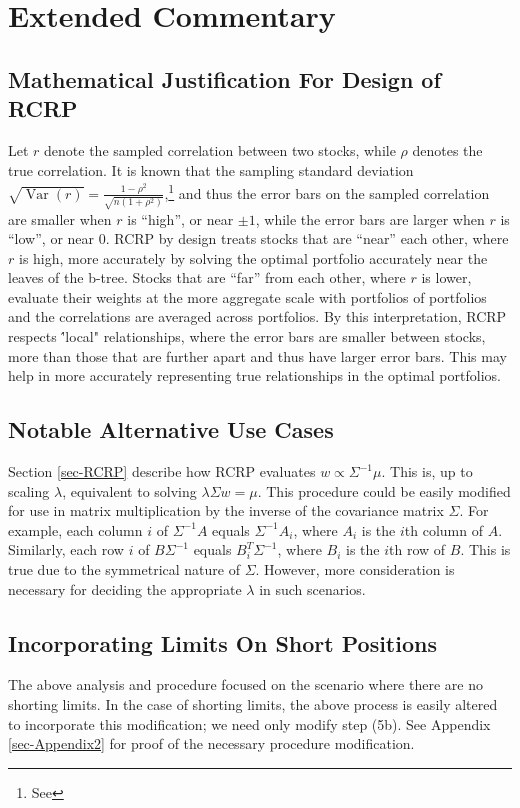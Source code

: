 \documentclass[10pt,twoside,titlepage]{article}   %
\begin{document}
\section{Extended Commentary}\label{sec-Commentary}
\subsection{Mathematical Justification For Design of RCRP}\label{sec-MatheComment}
Let $r$ denote the sampled correlation between two stocks, while $\rho$ denotes the true correlation.
It is known that the sampling standard deviation $\sqrt{\operatorname{Var}(r)}= \frac{ 1 - \rho^2}{\sqrt{n (1+\rho^2) }}$,\footnote{See \CORRURL}
and thus the error bars on the sampled correlation are smaller when $r$ is “high”, or near $\pm 1$,
while the error bars are larger when $r$ is “low”, or near 0.
RCRP by design treats stocks that are “near” each other, where $r$ is high,
more accurately by solving the optimal portfolio accurately near the leaves of the b-tree.
Stocks that are “far” from each other, where $r$ is lower,
evaluate their weights at the more aggregate scale with portfolios of portfolios and the correlations are averaged across portfolios.
By this interpretation, RCRP respects \''local" relationships, where the error bars are smaller between stocks, more than those that are further apart and thus have larger error bars.
This may help in more accurately representing true relationships in the optimal portfolios.

\subsection{Notable Alternative Use Cases}\label{sec-AltUseCase}
Section \ref{sec-RCRP} describe how RCRP evaluates $w \propto \Sigma^{-1}\mu$. This is, up to scaling $\lambda$, equivalent to solving $\lambda \Sigma w = \mu$.
This procedure could be easily modified for use in matrix multiplication by the inverse of the covariance matrix $\Sigma$.
For example, each column $i$ of $\Sigma^{-1}A$ equals $\Sigma^{-1}A_i$, where $A_i$ is the $i$th column of $A$.
Similarly, each row $i$ of $B\Sigma^{-1}$ equals $B_i^T\Sigma^{-1}$, where $B_i$ is the $i$th row of $B$.
This is true due to the symmetrical nature of $\Sigma$.
However, more consideration is necessary for deciding the appropriate $\lambda$ in such scenarios.

\subsection{Incorporating Limits On Short Positions}\label{sec-LimitShorts}
The above analysis and procedure focused on the scenario where there are no shorting limits.
In the case of shorting limits, the above process is easily altered to incorporate this modification; we need only modify step (5b).
See Appendix \ref{sec-Appendix2} for proof of the necessary procedure modification.
\end{document}
